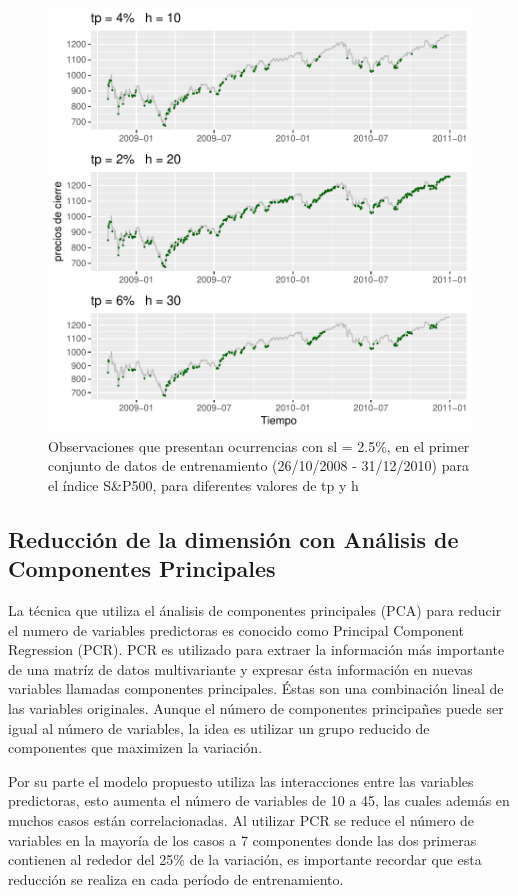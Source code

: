 \documentclass[a4paper,12pt]{Latex/Classes/PhDthesisPSnPDF}
\begin{document}
\begin{figure}[H]
\centering
\includegraphics{main-006}
\caption{Observaciones que presentan ocurrencias con sl = 2.5\%, en el primer conjunto de datos de entrenamiento (26/10/2008 - 31/12/2010) para el índice S&P500, para diferentes valores de tp y h}
\end{figure}

\subsection{Reducción de la dimensión con Análisis de Componentes Principales}

La técnica que utiliza el ánalisis de componentes principales (PCA) para reducir el numero de variables predictoras es conocido como Principal Component Regression (PCR). PCR es utilizado para extraer la información más importante de una matríz de datos multivariante y expresar ésta información en nuevas variables llamadas componentes principales. Éstas son una combinación lineal de las variables originales. Aunque el número de componentes principañes puede ser igual al número de variables, la idea es utilizar un grupo reducido de componentes que maximizen la variación.

Por su parte el modelo propuesto utiliza las interacciones entre las variables predictoras, esto aumenta el número de variables de 10 a 45, las cuales además en muchos casos están correlacionadas. Al utilizar PCR se reduce el número de variables en la mayoría de los casos a 7 componentes donde las dos primeras contienen al rededor del 25\% de la variación, es importante recordar que esta reducción se realiza en cada período de entrenamiento. 
\end{document}
